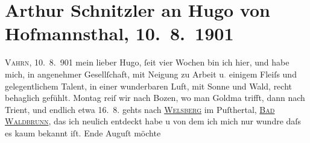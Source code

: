 

         
         \renewcommand{\erwaehntePersonen}{Personen: Leopold von Andrian-Werburg, Hermann Bahr, Paul Goldmann, Hugo von Hofmannsthal, Gertrude von Hofmannsthal, Robert Michel, Olga Schnitzler}
         \renewcommand{\erwaehnteOrte}{Orte: Bozen, Innsbruck, Schloss Weiherburg, Trient, Vahrn, Welsberg-Taisten, Wien, Wildbad Waldbrunn}
         \renewcommand{\erwaehnteWerke}{Werke: Der einsame Weg. Schauspiel in fünf Akten, Die Frau mit dem Dolche, Lebendige Stunden, Literatur}
               \section[Arthur Schnitzler an Hugo von Hofmannsthal, 10. 8. 1901]{ Arthur Schnitzler an Hugo von Hofmannsthal, 10. 8. 1901}\nopagebreak{}\rehead{ }\begin{ledgroupsized}[t]{13cm}\normalsize\beginnumbering \toendnotes[C]{\smallbreak\pagebreak[2]} 
\toendnotes[C]{\smallbreak}\pstart
           \raggedleft{}{\pb}\textsc{Vahrn}, 10. 8. 901\pend
           \pstart
           mein lieber Hugo, ſeit vier Wochen bin ich hier, und habe mich, in
               angenehmer Gesellſchaft, mit Neigung zu Arbeit u\textcolor{gray}{.} einigem Fleiſs
               und gelegentlichem Talent, in einer wunderbaren Luft, mit Sonne und Wald, recht
               behaglich gefühlt. Montag reiſ wir nach Bozen, wo man Goldma{\geminationn} trifft, dann nach Trient, und endlich etwa
                  16. 8. gehts nach \uline{\textsc{Welsberg}} im Puſthertal, \uline{\textsc{Bad Waldbrunn}}, das ich neulich entdeckt habe u von dem ich mich nur wundre {\pb}daſs es kaum bekannt iſt. Ende Auguſt möchte

\end{ledgroupsized}
